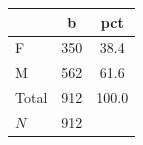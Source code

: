{
\def\sym#1{\ifmmode^{#1}\else\(^{#1}\)\fi}
\begin{tabular}{l*{1}{cc}}
\toprule
            &           b&         pct\\
\midrule
F           &         350&        38.4\\
M           &         562&        61.6\\
Total       &         912&       100.0\\
\midrule
\(N\)       &         912&            \\
\bottomrule
\end{tabular}
}
